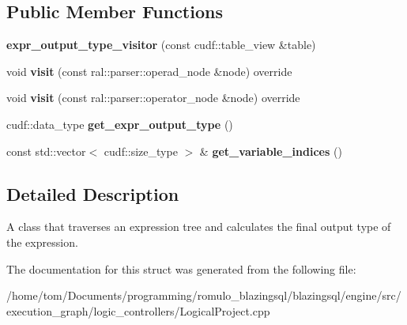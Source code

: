 \subsection*{Public Member Functions}
\begin{DoxyCompactItemize}
\item 
\mbox{\label{structral_1_1processor_1_1expr__output__type__visitor_a85683c095c432e8f8a5b24c9e0b5f02c}} 
{\bfseries expr\+\_\+output\+\_\+type\+\_\+visitor} (const cudf\+::table\+\_\+view \&table)
\item 
\mbox{\label{structral_1_1processor_1_1expr__output__type__visitor_a71cff76f357a59262a0c18f8d78cd596}} 
void {\bfseries visit} (const ral\+::parser\+::operad\+\_\+node \&node) override
\item 
\mbox{\label{structral_1_1processor_1_1expr__output__type__visitor_a868e8c51f23119b9c4beefb42a2efbb1}} 
void {\bfseries visit} (const ral\+::parser\+::operator\+\_\+node \&node) override
\item 
\mbox{\label{structral_1_1processor_1_1expr__output__type__visitor_ae3797eb6fa5ad63159f751ff9a9ec874}} 
cudf\+::data\+\_\+type {\bfseries get\+\_\+expr\+\_\+output\+\_\+type} ()
\item 
\mbox{\label{structral_1_1processor_1_1expr__output__type__visitor_a11b37c8d0617b881f900860ec0679bdc}} 
const std\+::vector$<$ cudf\+::size\+\_\+type $>$ \& {\bfseries get\+\_\+variable\+\_\+indices} ()
\end{DoxyCompactItemize}


\subsection{Detailed Description}
A class that traverses an expression tree and calculates the final output type of the expression. 

The documentation for this struct was generated from the following file\+:\begin{DoxyCompactItemize}
\item 
/home/tom/\+Documents/programming/romulo\+\_\+blazingsql/blazingsql/engine/src/execution\+\_\+graph/logic\+\_\+controllers/Logical\+Project.\+cpp\end{DoxyCompactItemize}
